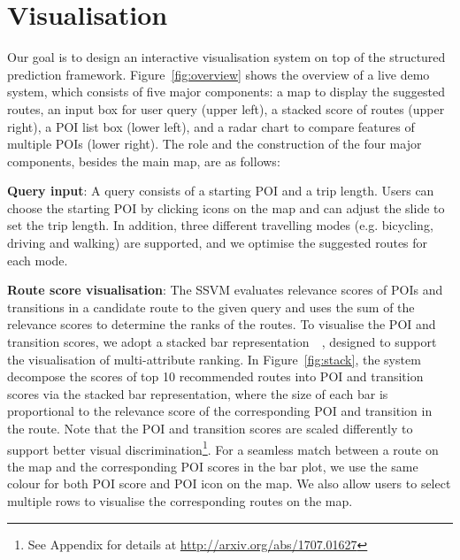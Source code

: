 \section{Visualisation}
Our goal is to design an interactive visualisation system on top of the structured prediction framework.
Figure~\ref{fig:overview} shows the overview of a live demo system, which consists of five major components: a map to display the suggested routes, an input box for user query (upper left), a stacked score of routes (upper right), a POI list box (lower left), and a radar chart to compare features of multiple POIs (lower right). 
The role and the construction of the four major components, besides the main map, are as follows:

\textbf{Query input}: A query consists of a starting POI and a trip length. 
Users can choose the starting POI by clicking icons on the map and can adjust the slide to set the trip length. 
In addition, three different travelling modes (e.g. bicycling, driving and walking) are supported, 
and we optimise the suggested routes for each mode.

\textbf{Route score visualisation}: 
The SSVM evaluates relevance scores of POIs and transitions in a candidate route to the given query and uses the sum of the relevance scores to determine the ranks of the routes.
To visualise the POI and transition scores, we adopt a stacked bar representation~~\cite{gratzl2013lineup}, designed to support the visualisation of multi-attribute ranking.
In Figure~\ref{fig:stack}, the system decompose the scores of top 10 recommended routes into POI and transition scores via the stacked bar representation, where the size of each bar is proportional to the relevance score of the corresponding POI and transition in the route.
Note that the POI and transition scores are scaled differently to support better visual discrimination\footnote{See Appendix for details at \url{http://arxiv.org/abs/1707.01627}}.
For a seamless match between a route on the map and the corresponding POI scores in the bar plot,
we use the same colour for both POI score and POI icon on the map.
We also allow users to select multiple rows to visualise the corresponding routes on the map.

